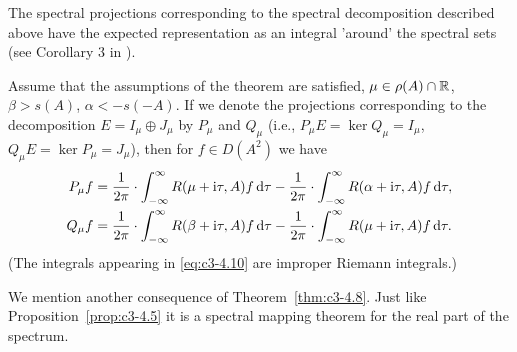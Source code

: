 The spectral projections corresponding to the spectral decomposition
described above have the expected representation as an integral
'around' the spectral sets (see Corollary 3 in \citet{greiner:1984c}).

\begin{corollary}\label{cor:c3-4.9}
Assume that the assumptions of the theorem are satisfied, $\mu \in \rho(A) \cap \mathbb{R} $, $\beta > s(A)$, $\alpha < -s(-A)$. If we denote the projections corresponding to the decomposition $E = I_{\mu} \oplus J_{\mu}$ by $P_{\mu}$ and $Q_{\mu}$
(i.e., $P_{\mu}E = \ker Q_{\mu} = I_{\mu}$, $Q_{\mu}E = \ker P_{\mu} = J_{\mu}$), then for $f \in D(A^2)$ we
have
\begin{equation}\label{eq:c3-4.10}
\begin{aligned}
	P_{\mu}f &= \frac{1}{2\pi} \cdot \int_{-\infty}^{\infty} R(\mu+\mathrm{i}\tau,A)f \mathop{}\!\mathrm{d}{\tau} - \frac{1}{2\pi} \cdot \int_{-\infty}^{\infty} R(\alpha+\mathrm{i}\tau,A)f \mathop{}\!\mathrm{d}{\tau} ,\\
	Q_{\mu}f &= \frac{1}{2\pi} \cdot \int_{-\infty}^{\infty} R(\beta+\mathrm{i}\tau,A)f \mathop{}\!\mathrm{d}{\tau} - \frac{1}{2\pi} \cdot \int_{-\infty}^{\infty} R(\mu+\mathrm{i}\tau,A)f \mathop{}\!\mathrm{d}{\tau} .
\end{aligned}
\end{equation}
(The integrals appearing in \eqref{eq:c3-4.10} are improper Riemann integrals.)
\end{corollary}
We mention another consequence of Theorem~\ref{thm:c3-4.8}. Just like Proposition~\ref{prop:c3-4.5} it is a
spectral mapping theorem for the real part of the spectrum.


